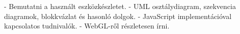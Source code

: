 
- Bemutatni a használt eszközkészletet.
- UML osztálydiagram, szekvencia diagramok, blokkvázlat és hasonló dolgok.
- JavaScript implementációval kapcsolatos tudnivalók.
- WebGL-ről részletesen írni.

